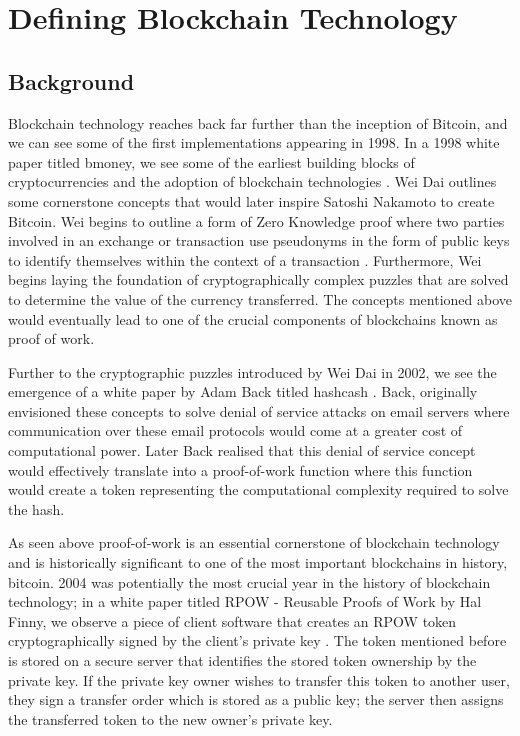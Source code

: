 \section{Defining Blockchain Technology}

\subsection{Background}

Blockchain technology reaches back far further than the inception of Bitcoin, and we can see some of the first implementations appearing in 1998.
In a 1998 white paper titled bmoney, we see some of the earliest building blocks of cryptocurrencies and the adoption of blockchain technologies \autocite{daiBmoney1998}.
Wei Dai outlines some cornerstone concepts that would later inspire Satoshi Nakamoto to create Bitcoin. Wei begins to outline a form of Zero Knowledge proof where two parties involved in an exchange or transaction use pseudonyms in the form of public keys to identify themselves within the context of a transaction \autocite{ZeroknowledgeProofsEthereum2022}. Furthermore, Wei begins laying the foundation of cryptographically complex puzzles that are solved to determine the value of the currency transferred. The concepts mentioned above would eventually lead to one of the crucial components of blockchains known as proof of work.\par
Further to the cryptographic puzzles introduced by Wei Dai in 2002, we see the emergence of a white paper by Adam Back titled hashcash \autocite{backHashcashDenialService2002}. Back, originally envisioned these concepts to solve denial of service attacks on email servers where communication over these email protocols would come at a greater cost of computational power. Later Back realised that this denial of service concept would effectively translate into a proof-of-work function where this function would create a token representing the computational complexity required to solve the hash.\par
As seen above proof-of-work is an essential cornerstone of blockchain technology and is historically significant to one of the most important blockchains in history, bitcoin. 2004 was potentially the most crucial year in the history of blockchain technology; in a white paper titled RPOW - Reusable Proofs of Work by Hal Finny, we observe a piece of client software that creates an RPOW token cryptographically signed by the client's private key \autocite{finneyRPOWReusableProofs}. The token mentioned before is stored on a secure server that identifies the stored token ownership by the private key. If the private key owner wishes to transfer this token to another user, they sign a transfer order which is stored as a public key; the server then assigns the transferred token to the new owner's private key.\par
